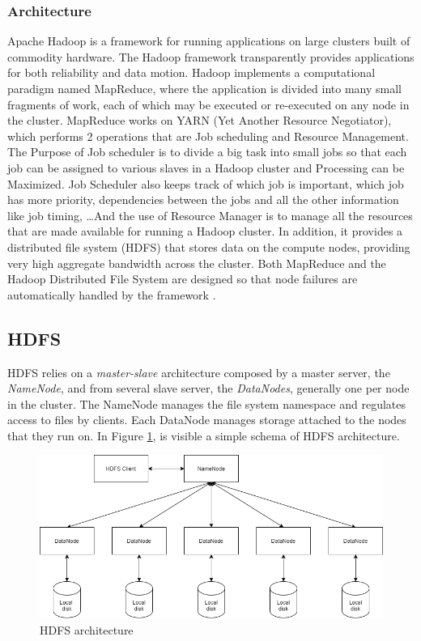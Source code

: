 \documentclass[\main/main.tex]{subfiles}
\begin{document}
\subsubsection{Architecture} Apache Hadoop is a framework for running applications on large clusters built of commodity hardware. The Hadoop framework transparently provides applications for both reliability and data motion. Hadoop implements a computational paradigm named MapReduce, where the application is divided into many small fragments of work, each of which may be executed or re-executed on any node in the cluster. MapReduce works on YARN (Yet Another Resource Negotiator), which performs 2 operations that are Job scheduling and Resource Management. The Purpose of Job scheduler is to divide a big task into small jobs so that each job can be assigned to various slaves in a Hadoop cluster and Processing can be Maximized. Job Scheduler also keeps track of which job is important, which job has more priority, dependencies between the jobs and all the other information like job timing, \dots And the use of Resource Manager is to manage all the resources that are made available for running a Hadoop cluster.  In addition, it provides a distributed file system (HDFS) that stores data on the compute nodes, providing very high aggregate bandwidth across the cluster. Both MapReduce and the Hadoop Distributed File System are designed so that node failures are automatically handled by the framework \cite{hadoop} \cite{hadoop_arch}.

\subsection{HDFS}
HDFS relies on a \emph{master-slave} architecture composed by a master server, the \emph{NameNode}, and from several slave server, the \emph{DataNodes}, generally one per node in the cluster. The NameNode manages the file system namespace and regulates access to files by clients. Each DataNode manages storage attached to the nodes that they run on. In Figure \ref{fig:hdfs_architecture}, is visible a simple schema of HDFS architecture.
\begin{figure}[H]
    \centering
    \includegraphics[scale=.5]{images/cluster_computing/hdfs_architecture.png}
    \caption{HDFS  architecture}
    \label{fig:hdfs_architecture}
\end{figure}
\end{document}
